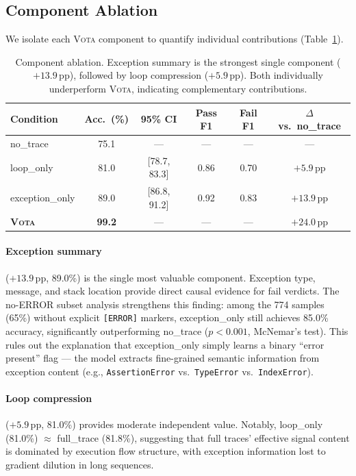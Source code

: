 \documentclass[11pt,a4paper]{article}
\newcommand{\vota}{\textsc{Vota}}
\newcommand{\pp}{\,\text{pp}}
\begin{document}
\subsection{Component Ablation}
\label{sec:component}

We isolate each \vota{} component to quantify individual contributions (Table~\ref{tab:component}).

\begin{table}[t]
\centering
\small
\begin{tabular}{lccccc}
\toprule
\textbf{Condition} & \textbf{Acc.\ (\%)} & \textbf{95\% CI} & \textbf{Pass F1} & \textbf{Fail F1} & \textbf{$\Delta$ vs.\ no\_trace} \\
\midrule
no\_trace & 75.1 & --- & --- & --- & --- \\
loop\_only & 81.0 & [78.7, 83.3] & 0.86 & 0.70 & $+5.9\pp$ \\
exception\_only & 89.0 & [86.8, 91.2] & 0.92 & 0.83 & $+13.9\pp$ \\
\textbf{\vota{}} & \textbf{99.2} & --- & --- & --- & $+24.0\pp$ \\
\bottomrule
\end{tabular}
\caption{Component ablation. Exception summary is the strongest single component ($+13.9\pp$), followed by loop compression ($+5.9\pp$). Both individually underperform \vota{}, indicating complementary contributions.}
\label{tab:component}
\end{table}

\paragraph{Exception summary} ($+13.9\pp$, 89.0\%) is the single most valuable component.
Exception type, message, and stack location provide direct causal evidence for fail verdicts.
The no-ERROR subset analysis strengthens this finding: among the 774 samples (65\%) without explicit \texttt{[ERROR]} markers, exception\_only still achieves 85.0\% accuracy, significantly outperforming no\_trace ($p < 0.001$, McNemar's test).
This rules out the explanation that exception\_only simply learns a binary ``error present'' flag --- the model extracts fine-grained semantic information from exception content (e.g., \texttt{AssertionError} vs.\ \texttt{TypeError} vs.\ \texttt{IndexError}).

\paragraph{Loop compression} ($+5.9\pp$, 81.0\%) provides moderate independent value.
Notably, loop\_only (81.0\%) $\approx$ full\_trace (81.8\%), suggesting that full traces' effective signal content is dominated by execution flow structure, with exception information lost to gradient dilution in long sequences.
\end{document}
